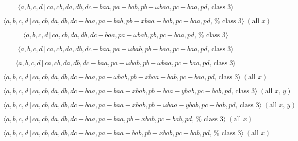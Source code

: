 \documentclass[10pt]{article}
\begin{document}
\begin{equation}
\langle a,b,c,d\,|\,ca,cb,da,db,dc-baa,pa-bab,pb-\omega baa,pc-baa,pd,\,%
\text{class }3\rangle  \tag{7.3463}
\end{equation}

\begin{equation}
\langle a,b,c,d\,|\,ca,cb,da,db,dc-baa,pa-bab,pb-xbaa-bab,pc-baa,pd,\,\text{%
class }3\rangle \;(\text{all }x)  \tag{7.3464}
\end{equation}

\begin{equation}
\langle a,b,c,d\,|\,ca,cb,da,db,dc-baa,pa-\omega bab,pb,pc-baa,pd,\,\text{%
class }3\rangle  \tag{7.3465}
\end{equation}

\begin{equation}
\langle a,b,c,d\,|\,ca,cb,da,db,dc-baa,pa-\omega bab,pb-baa,pc-baa,pd,\,%
\text{class }3\rangle  \tag{7.3466}
\end{equation}

\begin{equation}
\langle a,b,c,d\,|\,ca,cb,da,db,dc-baa,pa-\omega bab,pb-\omega
baa,pc-baa,pd,\,\text{class }3\rangle  \tag{7.3467}
\end{equation}

\begin{equation}
\langle a,b,c,d\,|\,ca,cb,da,db,dc-baa,pa-\omega bab,pb-xbaa-bab,pc-baa,pd,\,%
\text{class }3\rangle \;(\text{all }x)  \tag{7.3468}
\end{equation}

\begin{equation}
\langle a,b,c,d\,|\,ca,cb,da,db,dc-baa,pa-baa-xbab,pb-baa-ybab,pc-bab,pd,\,%
\text{class }3\rangle \;(\text{all }x,\,y)  \tag{7.3469}
\end{equation}

\begin{equation}
\langle a,b,c,d\,|\,ca,cb,da,db,dc-baa,pa-baa-xbab,pb-\omega
baa-ybab,pc-bab,pd,\,\text{class }3\rangle \;(\text{all }x,\,y)  \tag{7.3470}
\end{equation}

\begin{equation}
\langle a,b,c,d\,|\,ca,cb,da,db,dc-baa,pa-baa,pb-xbab,pc-bab,pd,\,\text{%
class }3\rangle \;(\text{all }x)  \tag{7.3471}
\end{equation}

\begin{equation}
\langle a,b,c,d\,|\,ca,cb,da,db,dc-baa,pa-baa-bab,pb-xbab,pc-bab,pd,\,\text{%
class }3\rangle \;(\text{all }x)  \tag{7.3472}
\end{equation}
\end{document}
